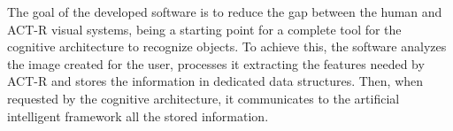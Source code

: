 	The goal of the developed software is to reduce the gap between the human and ACT-R visual systems, being a starting point for a complete  tool for the cognitive architecture to recognize objects. To achieve this, the software analyzes the image created for the user, processes it extracting the features needed by ACT-R and stores the information in dedicated data structures. Then, when requested by the cognitive architecture, it communicates to the artificial intelligent framework all the stored information. 
	

